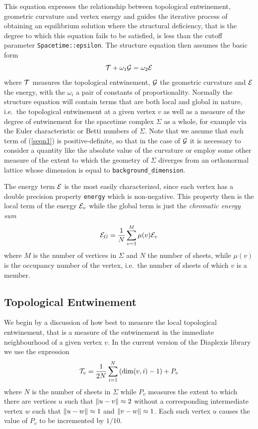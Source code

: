 \documentclass[12pt,letterpaper]{report}
\begin{document}
This equation expresses the relationship between topological entwinement, geometric 
curvature and vertex energy and guides the iterative process of obtaining an equilibrium 
solution where the structural deficiency, that is the degree to which this equation fails 
to be satisfied, is less than the cutoff parameter \texttt{Spacetime::epsilon}. The structure 
equation then assumes the basic form 
\begin{equation}
{\cal T} + \omega_1 {\cal G} = \omega_2 {\cal E}\label{seqn1}
\end{equation}
where $\cal{T}$ measures the topological entwinement, $\cal{G}$ the geometric curvature 
and $\cal{E}$ the energy, with the $\omega_i$ a pair of constants of proportionality. Normally 
the structure equation will contain terms that are both 
local and global in nature, i.e.\ the topological entwinement at a given vertex $v$ as 
well as a measure of the degree of entwinement for the spacetime complex $\Sigma$ as a 
whole, for example via the Euler characteristic or Betti numbers of $\Sigma$. Note that 
we assume that each term of (\ref{seqn1}) is positive-definite, so that in the case of 
$\cal{G}$ it is necessary to consider a quantity like the absolute value of the curvature 
or employ some other measure of the extent to which the geometry of $\Sigma$ diverges from 
an orthonormal lattice whose dimension is equal to \texttt{background\_dimension}.

The energy term ${\cal E}$ is the most easily characterized, since each vertex has a 
double precision property \texttt{energy} which is non-negative. This property then is the 
local term of the energy ${\cal E}_v$ while the global term is just the \emph{chromatic energy 
sum} 
\begin{equation*}
{\cal E}_G = \frac {1}{N}\sum_{v=1}^M \mu(v) {\cal E}_v
\end{equation*}  
where $M$ is the number of vertices in $\Sigma$ and $N$ the number of sheets, while $\mu(v)$ is 
the occupancy number of the vertex, i.e.\ the number of sheets of which $v$ is a member. 

\subsection{Topological Entwinement}

We begin by a discussion of how best to measure the local topological entwinement, that is a 
measure of the entwinement in the immediate neighbourhood of a given vertex $v$. In the current 
version of the Diaplexis library we use the expression 
\begin{equation}
{\cal T}_v = \frac {1}{2N} \sum_{i=1}^N\left(\dim(v,i) - 1\right) + P_v \label{tterm_local}
\end{equation}
where $N$ is the number of sheets in $\Sigma$ while $P_v$ measures the extent to which there are 
vertices $u$ such that $\left\lVert u - v\right\rVert \approx 2$ without a corresponding intermediate vertex $w$ 
such that $\left\lVert u - w\right\rVert\approx 1$ and $\left\lVert v - w\right\rVert \approx 1$. Each such vertex $u$ causes the 
value of $P_v$ to be incremented by $1/10$. 
\end{document}
